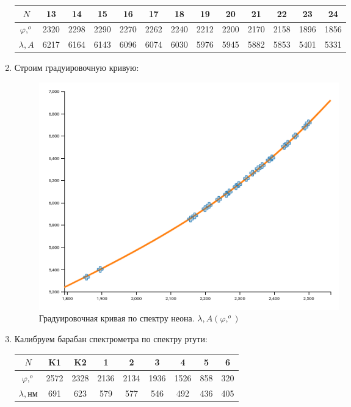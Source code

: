 \documentclass[a4paper,12pt]{article}
\begin{document}
\begin{enumerate}
  \begin{table}[H]
\begin{center}
\begin{tabular}{|c|c|c|c|c|c|c|c|c|c|c|c|c|}
\hline $N $&13 &14&15&16&17&18&19&20&21&22&23&24\\
\hline $\varphi , ^{o}$&2320&2298&2290&2270&2262&2240&2212&2200&2170&2158&1896&1856\\
\hline $\lambda, A
$&6217&6164&6143&6096&6074&6030&5976&5945&5882&5853&5401&5331\\
\hline 
\end{tabular}
\end{center}
\end{table}

\item Строим градуировочную кривую:

       \begin{figure}[H]
  \begin{center}
    \includegraphics[width=13cm]{gra1.png}
    \caption{Градуировочная кривая по спектру неона. $\lambda, A(\varphi, ^{o})$}
    \label{fig:}
  \end{center}
\end{figure}




\item Калибруем барабан спектрометра по спектру ртути:

  \begin{table}[H]
\begin{center}
\begin{tabular}{|c|c|c|c|c|c|c|c|c|}
\hline $N $&K1&K2&1&2&3&4&5&6\\
\hline $\varphi, ^{o}$&2572&2328&2136&2134&1936&1526&858&320\\
\hline $\lambda, нм$&691&623&579&577&546&492&436&405\\
\hline 
\end{tabular}
\end{center}
\end{table}



\end{enumerate}
\end{document}
